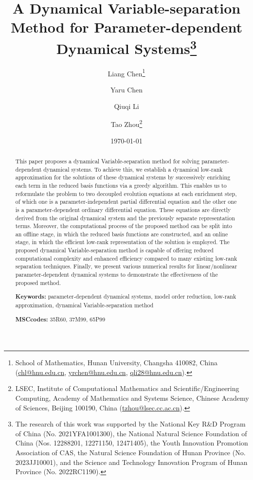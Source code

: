 \documentclass[10pt,a4paper]{article}
\title{\Large\bf
A Dynamical Variable-separation Method for Parameter-dependent Dynamical Systems\thanks{The research of this work was supported by the National Key R\&D Program of China (No. 2021YFA1001300), 
the National Natural Science Foundation of China (Nos. 12288201, 12271150, 12471405), 
the Youth Innovation Promotion Association of CAS, 
the Natural Science Foundation of Hunan Province (No. 2023JJ10001), 
and the Science and Technology Innovation Program of Hunan Province (No. 2022RC1190).}}
\author{Liang Chen\thanks{School of Mathematics, Hunan University, Changsha 410082, China
(\url{chl@hnu.edu.cn}, \url{yrchen@hnu.edu.cn}, \url{qli28@hnu.edu.cn}).}
\and Yaru Chen\footnotemark[2]
\and Qiuqi Li\footnotemark[2]
\and Tao Zhou\thanks{LSEC, Institute of Computational Mathematics and Scientific/Engineering Computing, Academy of Mathematics and Systems Science, Chinese Academy of Sciences, Beijing 100190, China 
 (\url{tzhou@lsec.cc.ac.cn}).}
}
\date{\today}
\numberwithin{equation}{section}
\numberwithin{lemma}{section}
\numberwithin{example}{section}
\numberwithin{definition}{section}
\numberwithin{assumption}{section}
\numberwithin{theorem}{section}
\numberwithin{proposition}{section}
\numberwithin{corollary}{section}
\numberwithin{remark}{section}
\begin{document}
\maketitle
 
\begin{abstract}
This paper proposes a dynamical Variable-separation method for solving parameter-dependent dynamical systems. To achieve this, we establish a dynamical low-rank approximation for the solutions of these dynamical systems by successively enriching each term in the reduced basis functions via a greedy algorithm. This enables us to reformulate the problem to two decoupled evolution equations at each enrichment step, of which one is a parameter-independent partial differential equation and the other one is a parameter-dependent ordinary differential equation. These equations are directly derived from the original dynamical system and the previously separate representation terms. Moreover, the computational process of the proposed method can be split into an offline stage, in which the reduced basis functions are constructed, and an online stage, in which the efficient low-rank representation of the solution is employed. The proposed dynamical Variable-separation method is capable of offering reduced computational complexity and enhanced efficiency compared to many existing low-rank separation techniques. Finally, we present various numerical results for linear/nonlinear parameter-dependent dynamical systems to demonstrate the effectiveness of the proposed method.
 
\bigskip
\noindent
{\bf Keywords:}
parameter-dependent dynamical systems, 
model order reduction,
low-rank approximation,
dynamical Variable-separation method

\medskip
\noindent 
{\bf MSCcodes:}
 35R60, 37M99, 65P99
\end{abstract}



 

 
 
\end{document}
